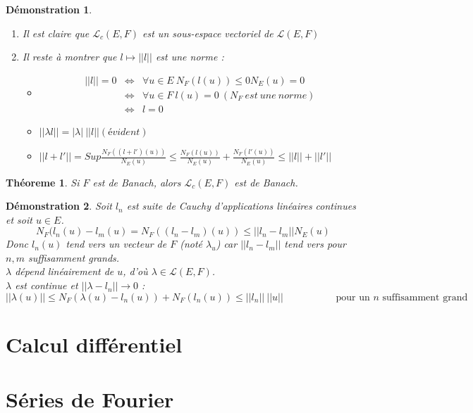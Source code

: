 \documentclass[a4paper, oneside]{report}
\theoremstyle{break}
\newtheorem{thm}{Théoreme}[section] %
\newtheorem*{demo}{Démonstration}
\renewcommand{\L}{\mathcal{L}}
\newcommand{\sev}{sous-espace vectoriel }
\newcommand{\aplins}{applications linéaires }
\begin{document}
\begin{demo}
\begin{enumerate}
\item Il est claire que $\L_c(E,F)$ est un \sev de $\L(E,F)$
\item Il reste à montrer que $l\mapsto ||l||$ est une norme :
\begin{itemize}
\item $$
\begin{array}{lll}
||l||=0 &\Leftrightarrow & \forall u\in E~N_F(l(u))\leq 0 N_E(u)=0\\
&\Leftrightarrow& \forall u\in F~l(u)=0~(N_F~est~une~norme)\\
&\Leftrightarrow& l=0
\end{array}$$

\item $||\lambda l||=|\lambda|~||l|| (évident)$

\item $||l+l'||=Sup \frac{N_F((l+l')(u))}{N_E(u)} \leq \frac{N_F(l(u))}{N_E(u)} + \frac{N_F(l'(u))}{N_E(u)} \leq ||l||+||l'||$
\end{itemize}
\end{enumerate}
\end{demo}

\begin{thm}
Si $F$ est de Banach, alors $\L_c(E,F)$ est de Banach.
\end{thm}

\begin{demo}
Soit $l_n$ est suite de Cauchy d'\aplins continues et soit $u\in E$.
$$N_F(l_n(u)-l_m(u)=N_F((l_n-l_m)(u))\leq ||l_n-l_m||N_E(u)$$
Donc $l_n(u)$ tend vers un vecteur de $F$ (noté $\lambda_u$) car $||l_n-l_m||$ tend vers  pour $n,m$ suffisamment grands.\\
$\lambda$ dépend linéairement de $u$, d'où $\lambda\in \L(E,F)$.\\
$\lambda$ est continue et $||\lambda - l_n||\rightarrow 0$ :
$$||\lambda(u)||\leq N_F(\lambda(u)-l_n(u))+N_F(l_n(u))\leq ||l_n||~||u||\hspace{5em}\text{ pour un }n\text{ suffisamment grand}$$
\end{demo}







\chapter{Calcul différentiel}

\chapter{Séries de Fourier}
\end{document}
